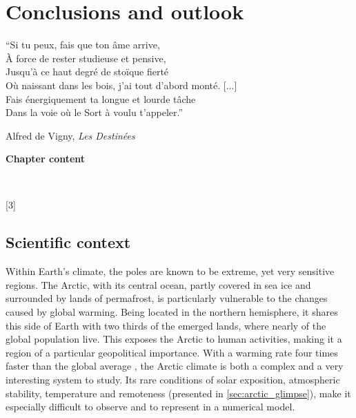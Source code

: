\makeatother
\setcounter{counterchapter}{6}

\chapter{Conclusions and outlook}\label{chap6}

 \epigraph{``Si tu peux, fais que ton âme arrive,\\
 À force de rester studieuse et pensive,\\
 Jusqu'à ce haut degré de stoïque fierté\\
 Où naissant dans les bois, j'ai tout d'abord monté. [...]\\
 Fais énergiquement ta longue et lourde tâche\\
 Dans la voie où le Sort à voulu t'appeler.''}{\vspace{\baselineskip}Alfred de Vigny, \textit{Les Destinées}} 

\newpage
\vspace*{\fill}
\begin{singlespace}
\textbf{Chapter content}

~

\startcontents[chapters]
[3]{}  %
\end{singlespace} 
\vspace*{\fill}
\newpage


\section{Scientific context}
Within Earth's climate, the poles are known to be extreme, yet very sensitive regions.
The Arctic, with its central ocean, partly covered in sea ice and surrounded by lands of permafrost, is particularly vulnerable to the changes caused by global warming.
Being located in the northern hemisphere, it shares this side of Earth with two thirds of the emerged lands, where nearly  of the global population live. This exposes the Arctic to human activities, making it a region of a particular geopolitical importance.
With a warming rate four times faster than the global average \citep{rantanen_arctic_2022}, the Arctic climate is both a complex and a very interesting system to study. 
Its rare conditions of solar exposition, atmospheric stability, temperature and remoteness (presented in \cref{sec:arctic_glimpse}), make it especially difficult to observe and to represent in a numerical model.

